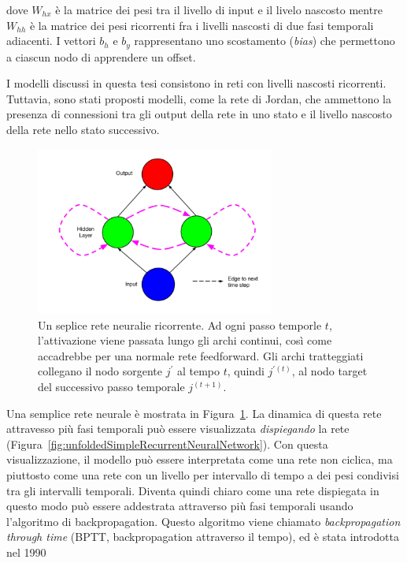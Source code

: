 dove $W_{hx}$ \`e la matrice dei pesi tra il livello di input e il livelo nascosto mentre $W_{hh}$ \`e la matrice dei pesi ricorrenti fra i livelli nascosti di due fasi temporali adiacenti.
I vettori $b_h$ e $b_y$ rappresentano uno scostamento (\emph{bias}) che permettono a ciascun nodo di apprendere un offset.

I modelli discussi in questa tesi consistono in reti con livelli nascosti ricorrenti.
Tuttavia, sono stati proposti modelli, come la rete di Jordan, che ammettono la presenza di connessioni tra gli output della rete in uno stato e il livello nascosto della rete nello stato successivo.

\begin{figure}[tp]
  \centering
  \begin{center}
    \includegraphics[width=0.7\textwidth]{./images/simpleRecurrentNeuralNetwork.png}
  \end{center}
  \caption{Un seplice rete neuralie ricorrente.
  Ad ogni passo temporle $t$, l'attivazione viene passata lungo gli archi continui, cos\`i come accadrebbe per una normale rete feedforward.
  Gli archi tratteggiati collegano il nodo sorgente $j^{'}$ al tempo $t$, quindi $j^{'(t)}$, al nodo target del successivo passo temporale $j^{(t+1)}$.}
  \label{fig:simpleRecurrentNeuralNetwork}
\end{figure}

Una semplice rete neurale \`e mostrata in Figura~\ref{fig:simpleRecurrentNeuralNetwork}.
La dinamica di questa rete attravesso pi\`u fasi temporali pu\`o essere visualizzata \emph{dispiegando} la rete (Figura~\ref{fig:unfoldedSimpleRecurrentNeuralNetwork}).
Con questa visualizzazione, il modello pu\`o essere interpretata come una rete non ciclica, ma piuttosto come una rete con un livello per intervallo di tempo a dei pesi condivisi tra gli intervalli temporali.
Diventa quindi chiaro come una rete dispiegata in questo modo pu\`o essere addestrata attraverso pi\`u fasi temporali usando l'algoritmo di backpropagation.
Questo algoritmo viene chiamato \emph{backpropagation through time} (BPTT, backpropagation attraverso il tempo), ed \`e stata introdotta nel 1990~\cite{Werbos:1990}

